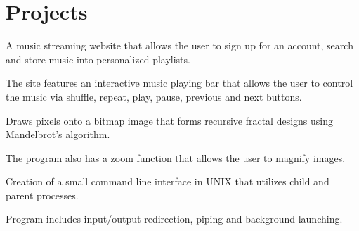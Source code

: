 \documentclass[letterpaper]{deedy-resume} %
\begin{document}
\begin{minipage}[t]{0.66\textwidth} %


\section{Projects}

\hfill {}

\vspace{\topsep} %
\begin{tightitemize}
\item A music streaming website that allows the user to sign up for an account, search and store music into personalized playlists.
\item The site features an interactive music playing bar that allows the user to control the music via shuffle, repeat, play, pause, previous and next buttons.
\end{tightitemize}

\sectionspace %


\hfill {}

\vspace{\topsep} %
\begin{tightitemize}
\item Draws pixels onto a bitmap image that forms recursive fractal designs using Mandelbrot’s algorithm.
\item The program also has a zoom function that allows the user to magnify images.
\end{tightitemize}

\sectionspace %


\hfill {}

\vspace{\topsep} %
\begin{tightitemize}
\item Creation of a small command line interface in UNIX that utilizes child and parent processes.
\item Program includes input/output redirection, piping and background launching.
\end{tightitemize}


\end{minipage}
\end{document}
